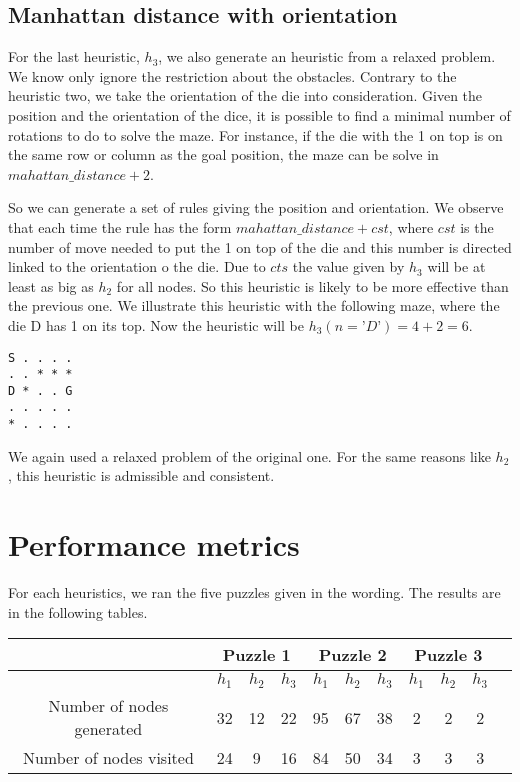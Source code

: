 \documentclass[]{article}
\begin{document}
\subsection{Manhattan distance with orientation}
For the last heuristic, $h_3$, we also generate an heuristic from a relaxed problem.
We know only ignore the restriction about the obstacles.
Contrary to the heuristic two, we take the orientation of the die into consideration.
Given the position and the orientation of the dice, it is possible to find a minimal number of rotations to do to solve the maze.
For instance, if the die with the 1 on top is on the same row or column as the goal position, the maze can be solve in $mahattan\_distance + 2$.

So we can generate a set of rules giving the position and orientation.
We observe that each time the rule has the form  $mahattan\_distance + cst$, where $cst$ is the number of move needed to put the 1 on top of the die and this number is directed linked to the orientation o the die.
Due to $cts$ the value given by $h_3$ will be at least as big as $h_2$ for all nodes.
So this heuristic is likely to be more effective than the previous one.
We illustrate this heuristic with the following maze, where the die D has 1 on its top.
Now the heuristic will be $h_3(n=’D’) = 4 + 2 = 6$.

\begin{lstlisting}
S . . . .
. . * * *
D * . . G
. . . . .
* . . . .
\end{lstlisting}

We again used a relaxed problem of the original one.
For the same reasons like $h_2$, this heuristic is admissible and consistent.

\section{Performance metrics}

For each heuristics, we ran the five puzzles given in the wording.
The results are in the following tables.

\begin{center}
    \begin{tabular}{| c | c | c | c | c | c | c | c | c | c | c |}
      \cline{2-10} & \multicolumn{3}{|c|}{Puzzle 1} & \multicolumn{3}{|c|}{Puzzle 2} & \multicolumn{3}{|c|}{Puzzle 3} \\
      \hline
    & $h_1$ & $h_2$ & $h_3$ & $h_1$ & $h_2$& $h_3$ & $h_1$ &  $h_2$ & $h_3$ \\ \hline
    Number of nodes generated & 32 & 12 & 22 & 95 & 67 & 38 & 2 & 2 & 2 \\ \hline
    Number of nodes visited   & 24 & 9  & 16 & 84 & 50 & 34 & 3 & 3 & 3 \\ \hline
    \end{tabular}
\end{center}
\end{document}
